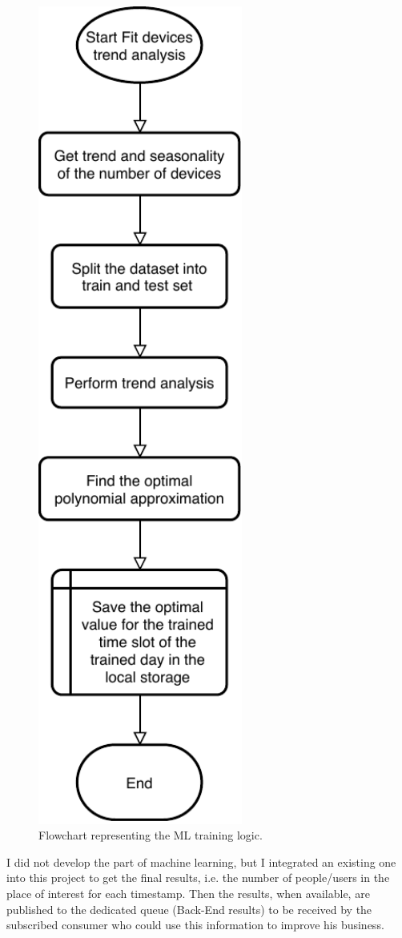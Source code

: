 \begin{figure}
\begin{minipage}[b]{8.5cm}
\includegraphics[width=0.6\textwidth]{images/flowtrainML}
\caption{Flowchart representing the ML training logic.}
\label{fig:flowtrainML}
\end{minipage}
\end{figure}

I did not develop the part of machine learning, but I integrated an existing one into this project to get the final results, i.e. the number of people/users in the place of interest for each timestamp. Then the results, when available, are published to the dedicated queue (Back-End results) to be received by the subscribed consumer who could use this information to improve his business.
